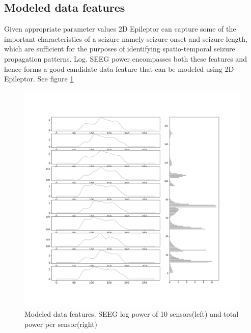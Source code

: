 \documentclass[12pt]{article}
\begin{document}
\subsection*{Modeled data features}
Given appropriate parameter values 2D Epileptor can capture some of the important characteristics of a seizure namely seizure onset and seizure length, which are sufficient for the purposes of identifying spatio-temporal seizure propagation patterns. Log. SEEG power encompasses both these features and hence forms a good candidate data feature that can be modeled using 2D Epileptor. See figure \ref{fig:data-features}
\begin{figure}[h!]
  \centering
  \includegraphics[width=\textwidth]{figures/modelled_data_features.png}
  \caption{Modeled data features. SEEG log power of 10 sensors(left) and total power per sensor(right)}
  \label{fig:data-features}
\end{figure}
\end{document}
